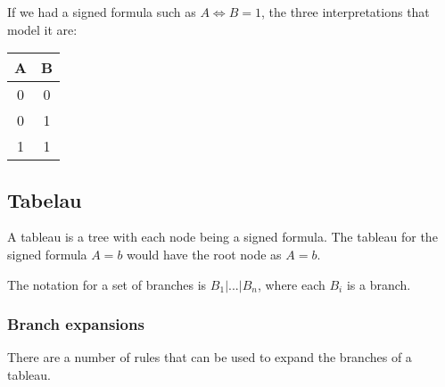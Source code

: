 If we had a signed formula such as $A \Leftrightarrow B = 1$, the three
interpretations that model it are:

\begin{center}
    \begin{tabular}{cc}
        A & B\\ \hline
        0 & 0\\
        0 & 1\\
        1 & 1\\
    \end{tabular}
\end{center}

\subsection{Tabelau}

A tableau is a tree with each node being a signed formula. The tableau for the
signed formula $A = b$ would have the root node as $A = b$.

The notation for a set of branches is $B_1 | ... | B_n$, where each $B_i$ is a
branch.

\subsubsection{Branch expansions}

There are a number of rules that can be used to expand the branches of a
tableau.
